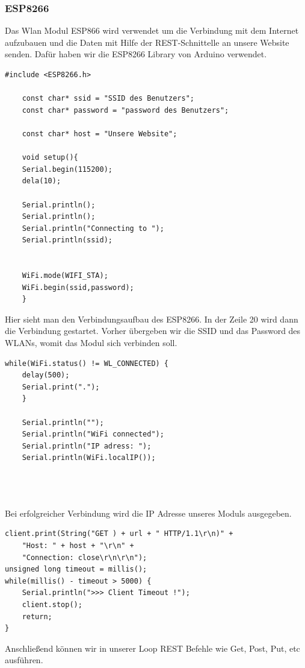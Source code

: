 \subsubsection{ESP8266}                                                                                             
Das Wlan Modul ESP866 wird verwendet um die Verbindung mit dem Internet aufzubauen und die Daten mit Hilfe der REST-Schnittelle an unsere Website senden. Dafür haben wir die ESP8266 Library von Arduino verwendet.\cite{esp8266}
\begin{lstlisting}[caption=Verbindungsaufbau des ESP8266]
	#include <ESP8266.h>
	
	const char* ssid = "SSID des Benutzers";
	const char* password = "password des Benutzers";
	
	const char* host = "Unsere Website";
	
	void setup(){
	Serial.begin(115200);
	dela(10);
	
	Serial.println();
	Serial.println();
	Serial.println("Connecting to ");
	Serial.println(ssid);
	
	
	WiFi.mode(WIFI_STA);
	WiFi.begin(ssid,password);
	}
\end{lstlisting}
                                                                                                       
Hier sieht man den Verbindungsaufbau des ESP8266. In der Zeile 20 wird dann die Verbindung gestartet. Vorher übergeben wir die SSID und das Password des WLANs, womit das Modul sich verbinden soll.
\newpage
\begin{lstlisting}[caption=Verbindungsaufbau Response]
	while(WiFi.status() != WL_CONNECTED) {
	delay(500);
	Serial.print(".");
	}
	
	Serial.println("");
	Serial.println("WiFi connected");
	Serial.println("IP adress: ");
	Serial.println(WiFi.localIP());
	
	


\end{lstlisting}

Bei erfolgreicher Verbindung wird die IP Adresse unseres Moduls ausgegeben.

\begin{lstlisting}[caption=Ausführung der REST Befehle]
client.print(String("GET ) + url + " HTTP/1.1\r\n)" +
	"Host: " + host + "\r\n" + 
	"Connection: close\r\n\r\n");
unsigned long timeout = millis();
while(millis() - timeout > 5000) {
	Serial.println(">>> Client Timeout !");
	client.stop();
	return;
}
\end{lstlisting}
Anschließend können wir in unserer Loop REST Befehle wie Get, Post, Put, etc ausführen.


